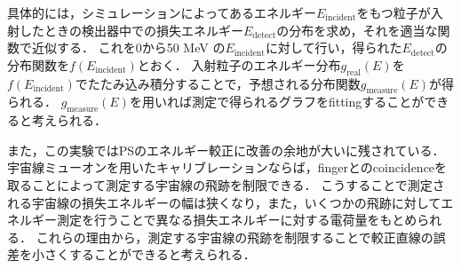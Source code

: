   具体的には，シミュレーションによってあるエネルギー$E_\mathrm{incident}$をもつ粒子が入射したときの検出器中での損失エネルギー$E_\mathrm{detect}$の分布を求め，それを適当な関数で近似する．
  これを0から50 MeV の$E_\mathrm{incident}$に対して行い，得られた$E_\mathrm{detect}$の分布関数を$f(E_\mathrm{incident})$とおく．
  入射粒子のエネルギー分布$g_{\mathrm{real}}(E)$を$f(E_\mathrm{incident})$でたたみ込み積分することで，予想される分布関数$g_{\mathrm{measure}}(E)$が得られる．
  $g_{\mathrm{measure}}(E)$を用いれば測定で得られるグラフをfittingすることができると考えられる．
  
  また，この実験ではPSのエネルギー較正に改善の余地が大いに残されている．
  宇宙線ミューオンを用いたキャリブレーションならば，fingerとのcoincidenceを取ることによって測定する宇宙線の飛跡を制限できる．
  こうすることで測定される宇宙線の損失エネルギーの幅は狭くなり，また，いくつかの飛跡に対してエネルギー測定を行うことで異なる損失エネルギーに対する電荷量をもとめられる．
  これらの理由から，測定する宇宙線の飛跡を制限することで較正直線の誤差を小さくすることができると考えられる．





